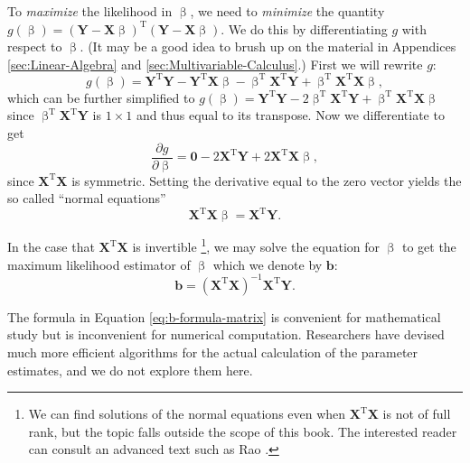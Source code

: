 \documentclass[captions=tableheading]{scrbook}
\begin{document}
To \emph{maximize} the likelihood in $\upbeta$, we need to \emph{minimize} the quantity $g(\upbeta)=\left(\mathbf{Y}-\mathbf{X}\upbeta\right)^{\mathrm{T}}\left(\mathbf{Y}-\mathbf{X}\upbeta\right)$. We do this by differentiating $g$ with respect to $\upbeta$. (It may be a good idea to brush up on the material in Appendices \ref{sec:Linear-Algebra} and \ref{sec:Multivariable-Calculus}.) First we will rewrite $g$:
\begin{equation}
g(\upbeta)=\mathbf{Y}^{\mathrm{T}}\mathbf{Y}-\mathbf{Y}^{\mathrm{T}}\mathbf{X}\upbeta-\upbeta^{\mathrm{T}}\mathbf{X}^{\mathrm{T}}\mathbf{Y}+\upbeta^{\mathrm{T}}\mathbf{X}^{\mathrm{T}}\mathbf{X}\upbeta,
\end{equation}
which can be further simplified to $g(\upbeta)=\mathbf{Y}^{\mathrm{T}}\mathbf{Y}-2\upbeta^{\mathrm{T}}\mathbf{X}^{\mathrm{T}}\mathbf{Y}+\upbeta^{\mathrm{T}}\mathbf{X}^{\mathrm{T}}\mathbf{X}\upbeta$ since $\upbeta^{\mathrm{T}}\mathbf{X}^{\mathrm{T}}\mathbf{Y}$ is $1\times1$ and thus equal to its transpose. Now we differentiate to get
\begin{equation}
\frac{\partial g}{\partial\upbeta}=\mathbf{0}-2\mathbf{X}^{\mathrm{T}}\mathbf{Y}+2\mathbf{X}^{\mathrm{T}}\mathbf{X}\upbeta,
\end{equation}
since $\mathbf{X}^{\mathrm{T}}\mathbf{X}$ is symmetric. Setting the derivative equal to the zero vector yields the so called ``normal equations''
\begin{equation}
\mathbf{X}^{\mathrm{T}}\mathbf{X}\upbeta=\mathbf{X}^{\mathrm{T}}\mathbf{Y}.
\end{equation}

In the case that $\mathbf{X}^{\mathrm{T}}\mathbf{X}$ is invertible
\footnote{We can find solutions of the normal equations even when $\mathbf{X}^{\mathrm{T}}\mathbf{X}$ is not of full rank, but the topic falls outside the scope of this book. The interested reader can consult an advanced text such as Rao \cite{Rao1999}.},
we may solve the equation for $\upbeta$ to get the maximum likelihood estimator of $\upbeta$ which we denote by $\mathbf{b}$:
\begin{equation}
\mathbf{b}=\left(\mathbf{X}^{\mathrm{T}}\mathbf{X}\right)^{-1}\mathbf{X}^{\mathrm{T}}\mathbf{Y}.\label{eq:b-formula-matrix}
\end{equation}

\begin{rem}
The formula in Equation \ref{eq:b-formula-matrix} is convenient for mathematical study but is inconvenient for numerical computation. Researchers have devised much more efficient algorithms for the actual calculation of the parameter estimates, and we do not explore them here.
\end{rem}
\end{document}
